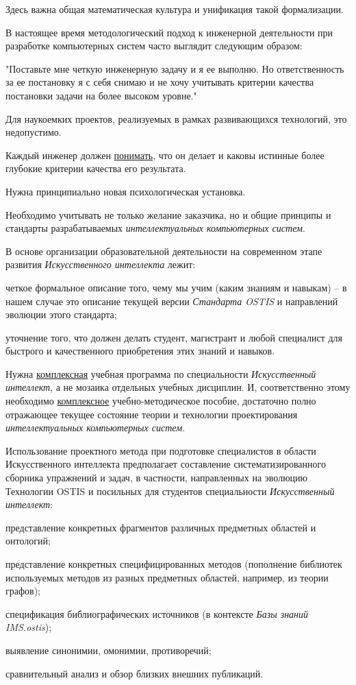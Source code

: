 {	Здесь важна общая математическая культура и унификация такой формализации.
	
	В настоящее время методологический подход к инженерной деятельности при разработке компьютерных систем часто выглядит следующим образом:
	
	"Поставьте мне четкую инженерную задачу и я ее выполню. Но ответственность за ее постановку я с себя снимаю и не хочу учитывать критерии качества постановки задачи на более высоком уровне."{}
	
	Для наукоемких проектов, реализуемых в рамках развивающихся технологий, это недопустимо.
	
	Каждый инженер должен \uline{понимать}, что он делает и каковы истинные более глубокие критерии качества его результата.
	
	Нужна принципиально новая психологическая установка.
	
	Необходимо учитывать не только желание заказчика, но и общие принципы и стандарты разрабатываемых \textit{интеллектуальных компьютерных систем}.
	
	В основе организации образовательной деятельности на современном этапе развития \textit{Искусственного интеллекта} лежит:
	\begin{scnitemize}
		\item четкое формальное описание того, чему мы учим (каким знаниям и навыкам) -- в нашем случае это описание текущей версии \textit{Стандарта OSTIS} и направлений эволюции этого стандарта;
		\item уточнение того, что должен делать студент, магистрант и любой специалист для быстрого и качественного приобретения этих знаний и навыков.
	\end{scnitemize}
	
	Нужна \uline{комплексная} учебная программа по специальности \textit{Искусственный интеллект}, а не мозаика отдельных учебных дисциплин. И, соответственно этому необходимо \uline{комплексное} учебно-методическое пособие, достаточно полно отражающее текущее состояние теории и технологии проектирования \textit{интеллектуальных компьютерных систем}.
	
	Использование проектного метода при подготовке специалистов в области Искусственного интеллекта предполагает составление систематизированного сборника упражнений и задач, в частности, направленных на эволюцию Технологии OSTIS и посильных для студентов специальности \textit{Искусственный интеллект}:
	\begin{scnitemize}
		\item представление конкретных фрагментов различных предметных областей и онтологий;	
		\item представление конкретных специфицированных методов (пополнение библиотек используемых методов из разных предметных областей, например, из теории графов);
		\item спецификация библиографических источников (в контексте \textit{Базы знаний IMS.ostis});
		\item выявление синонимии, омонимии, противоречий;
		\item сравнительный анализ и обзор близких внешних публикаций.
	\end{scnitemize}
	
}
